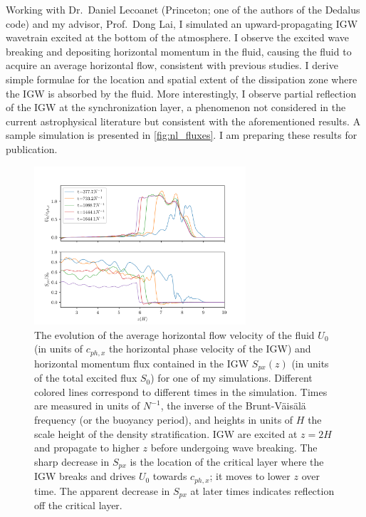 \documentclass[12pt,
        usenames, %
        dvipsnames %
    ]{article}
\begin{document}
Working with Dr.\ Daniel Lecoanet (Princeton; one of the authors of the Dedalus
code) and my advisor, Prof.\ Dong Lai, I simulated an upward-propagating IGW
wavetrain excited at the bottom of the atmosphere. I observe the excited wave
breaking and depositing horizontal momentum in the fluid, causing the fluid to
acquire an average horizontal flow, consistent with previous
studies\cite{fullerII}. I derive simple formulae for the location and spatial
extent of the dissipation zone where the IGW is absorbed by the fluid. More
interestingly, I observe partial reflection of the IGW at the synchronization
layer\cite{me}, a phenomenon not considered in the current astrophysical
literature but consistent with the aforementioned results\cite{winters1994}. A
sample simulation is presented in \autoref{fig:nl_fluxes}. I am preparing these
results for publication\cite{me}.

\begin{figure}[!h]
    \centering
    \includegraphics[width=0.7\textwidth]{nl_fluxes.png}
    \caption{The evolution of the average horizontal flow velocity of the fluid
    $U_0$ (in units of $c_{ph,x}$ the horizontal phase velocity of the IGW) and
    horizontal momentum flux contained in the IGW $S_{px}(z)$ (in units of the
    total excited flux $S_0$) for one of my simulations. Different colored lines
    correspond to different times in the simulation. Times are measured in units
    of $N^{-1}$, the inverse of the Brunt-V\"ais\"al\"a frequency (or the
    buoyancy period), and heights in units of $H$ the scale height of the
    density stratification. IGW are excited at $z = 2H$ and propagate to higher
    $z$ before undergoing wave breaking. The sharp decrease in $S_{px}$ is
    the location of the critical layer where the IGW breaks and drives $U_0$
    towards $c_{ph, x}$; it moves to lower $z$ over time. The apparent decrease
    in $S_{px}$ at later times indicates reflection off the critical
    layer.}\label{fig:nl_fluxes}
\end{figure}
\end{document}
